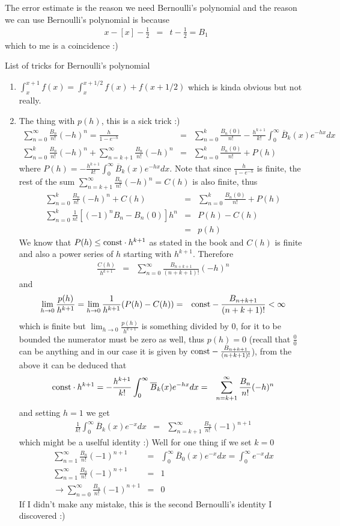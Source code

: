 \documentclass[aps,preprint,preprintnumbers,nofootinbib,showpacs,prd]{revtex4-1}
\newcommand{\nbea}{\begin{eqnarray*}}
\newcommand{\neea}{\end{eqnarray*}}
\begin{document}
The error estimate is the reason we need Bernoulli's polynomial and the reason we can use Bernoulli's polynomial is because
%
\nbea
x -[x] - \frac{1}{2} & = & t - \frac{1}{2} = B_1
\neea
%
which to me is a coincidence :)

List of tricks for Bernoulli's polynomial
%
\begin{enumerate}
%
\item $\int_x^{x + 1} f(x) = \int_x^{x+1/2} f(x) + f(x + 1/2)$ which is kinda obvious but not really.
%
\item The thing with $p(h)$, this is a sick trick :)
%
\nbea
\sum_{n=0}^\infty \frac{B_n}{n!}(-h)^n = \frac{h}{1 - e^{-h}} & = & \sum_{n = 0}^k \frac{B_n(0)}{n!} - \frac{h^{k+1}}{k!} \int_0^\infty \overline{B}_k(x) e^{-hx} dx \\
\sum_{n=0}^k \frac{B_n}{n!}(-h)^n + \sum_{n=k+1}^\infty \frac{B_n}{n!}(-h)^n & = & \sum_{n = 0}^k \frac{B_n(0)}{n!} + P(h) 
\neea
%
where $P(h) = - \frac{h^{k+1}}{k!} \int_0^\infty \overline{B}_k(x) e^{-hx} dx$. Note that since $\frac{h}{1 - e^{-h}}$ is finite, the rest of the sum $\sum_{n=k+1}^\infty \frac{B_n}{n!}(-h)^n = C(h)$ is also finite, thus
%
\nbea
\sum_{n=0}^k \frac{B_n}{n!}(-h)^n + C(h) & = & \sum_{n = 0}^k \frac{B_n(0)}{n!} + P(h)  \\
\sum_{n=0}^k \frac{1}{n!}[(-1)^nB_n - B_n(0)]h^n & = & P(h) - C(h) \\
& = & p(h)
\neea
%
We know that $P(h) \le {\rm const} \cdot h^{k+1}$ as stated in the book and $C(h)$ is finite and also a power series of $h$ starting with $h^{k+1}$. Therefore
%
\nbea
\frac{C(h)}{h^{k+1}} & = & \sum_{n = 0}^\infty \frac{B_{n+k+1}}{(n+k+1)!} (-h)^n
\neea
%
and
%
\nbea
\lim_{h\to 0} \frac{p(h)}{h^{k+1}} = \lim_{h\to 0} \frac{1}{h^{k+1}} (P(h) - C(h)) & = & {\rm const} - \frac{B_{n+k+1}}{(n+k+1)!} < \infty
\neea
%
which is finite but $\lim_{h\to0} \frac{p(h)}{h^{k+1}}$ is something divided by 0, for it to be bounded the numerator must be zero as well, thus $p(h) = 0$ (recall that $\frac{0}{0}$ can be anything and in our case it is given by ${\rm const} - \frac{B_{n+k+1}}{(n+k+1)!}$), from the above it can be deduced that
%
\nbea
{\rm const} \cdot h^{k+1} = -\frac{h^{k+1}}{k!} \int_0^\infty \overline{B}_k(x) e^{-hx} dx & = & \sum_{n = k+1}^\infty \frac{B_{n}}{n!} (-h)^n
\neea
%
and setting $h = 1$ we get
%
\nbea
\frac{1}{k!} \int_0^\infty \overline{B}_k(x) e^{-x} dx & = & \sum_{n = k+1}^\infty \frac{B_{n}}{n!} (-1)^{n+1}
\neea
%
which might be a uselful identity :) Well for one thing if we set $k=0$
%
\nbea
\sum_{n = 1}^\infty \frac{B_{n}}{n!} (-1)^{n+1} & = & \int_0^\infty \overline{B}_0 (x) e^{-x} dx = \int_0^\infty e^{-x} dx \\
\sum_{n = 1}^\infty \frac{B_{n}}{n!} (-1)^{n+1} & = & 1 \\
\to \sum_{n = 0}^\infty \frac{B_{n}}{n!} (-1)^{n+1} & = & 0
\neea
%
If I didn't make any mistake, this is the second Bernoulli's identity I discovered :)
\end{enumerate}
%
\end{document}
